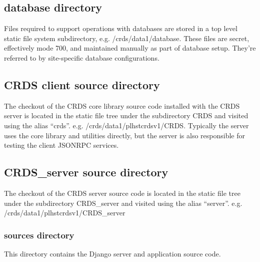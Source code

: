 \documentclass[letterpaper,10pt,english]{sphinxmanual}
\begin{document}
\subsection{database directory}
\label{server_guide:database-directory}
Files required to support operations with databases are stored in a top level static file system
subdirectory,  e.g. /crds/data1/database.   These files are secret,  effectively mode 700, and maintained
manually as part of database setup.  They're referred to by site-specific database configurations.


\subsection{CRDS client source directory}
\label{server_guide:crds-client-source-directory}
The checkout of the CRDS core library source code installed with the CRDS server is located in the static file tree
under the subdirectory CRDS and visited using the alias ``crds''.  e.g.  /crds/data1/plhstcrdsv1/CRDS.  Typically
the server uses the core library and utilities directly,  but the server is also responsible for testing the client
JSONRPC services.


\subsection{CRDS\_server source directory}
\label{server_guide:crds-server-source-directory}
The checkout of the CRDS server source code is located in the static file tree under the subdirectory CRDS\_server
and visited using the alias ``server''.  e.g. /crds/data1/plhstcrdsv1/CRDS\_server


\subsubsection{sources directory}
\label{server_guide:sources-directory}
This directory contains the Django server and application source code.
\end{document}
